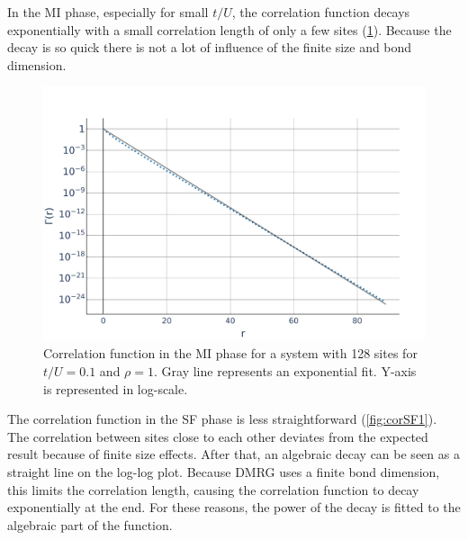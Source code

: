 \documentclass[twoside,twocolumn,9pt]{article}
\begin{document}
In the MI phase, especially for small $t/U$, the correlation function decays exponentially with a small correlation length of only a few sites (\cref{fig:corMI1}). Because the decay is so quick there is not a lot of influence of the finite size and bond dimension.
\begin{center}
  \begin{figure}
      \includegraphics[width=\linewidth]{../code/figures/Correlations-MI1.pdf}
      \caption{Correlation function in the MI phase for a system with 128 sites for $t/U=0.1$ and $\rho=1$. Gray line represents an exponential fit. Y-axis is represented in log-scale.}
      \label{fig:corMI1}
  \end{figure}
\end{center}
The correlation function in the SF phase is less straightforward (\cref{fig:corSF1}). The correlation between sites close to each other deviates from the expected result because of finite size effects. After that, an algebraic decay can be seen as a straight line on the log-log plot. Because DMRG uses a finite bond dimension, this limits the correlation length, causing the correlation function to decay exponentially at the end. For these reasons, the power of the decay is fitted to the algebraic part of the function.
\end{document}
